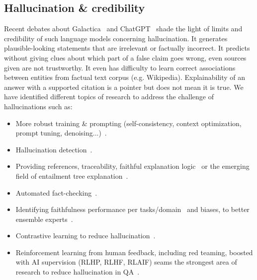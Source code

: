 \documentclass[acmsmall]{acmart}
\begin{document}
\subsection{Hallucination \& credibility}
Recent debates about Galactica~\citep{taylorGalacticaLargeLanguage2022, WhyMetaLatest} and ChatGPT~\citep{rudolphChatGPTBullshitSpewer2023} shade the light of limits and credibility of such language models concerning hallucination. It generates plausible-looking statements that are irrelevant or factually incorrect. It predicts without giving clues about which part of a false claim goes wrong, even sources given are not trustworthy. It even has difficulty to learn correct associations between entities from factual text corpus (e.g. Wikipedia). Explainability of an answer with a supported citation is a pointer but does not mean it is true. We have identified different topics of research to address the challenge of hallucinations such as:
\begin{itemize}
    \item More robust training \& prompting (self-consistency, context optimization, prompt tuning, denoising...)~\citep{lyuFaithfulChainofThoughtReasoning2023}.
    \item Hallucination detection~\citep{zhouDetectingHallucinatedContent2021}.
    \item Providing references, traceability, faithful explanation logic~\citep{chenLORENLogicRegularizedReasoning2022} or the emerging field of entailment tree explanation~\citep{ribeiroEntailmentTreeExplanations2022, liuRLETReinforcementLearning2022}.
    \item Automated fact-checking~\citep{guoSurveyAutomatedFactChecking2022}.
    \item Identifying faithfulness performance per tasks/domain~\citep{liangetal.HolisticEvaluationLanguage2022} and biases, to better ensemble experts~\citep{choubeyMoFEMixtureFactual2021}.
    \item Contrastive learning to reduce hallucination~\citep{sunContrastiveLearningReduces2022}.
    \item Reinforcement learning from human feedback, including red teaming, boosted with AI supervision (RLHP, RLHF, RLAIF) seams the strongest area of research to reduce hallucination in QA~\citep{baiConstitutionalAIHarmlessness2022, ganguliRedTeamingLanguage2022, baiTrainingHelpfulHarmless2022}.
\end{itemize}
\end{document}
